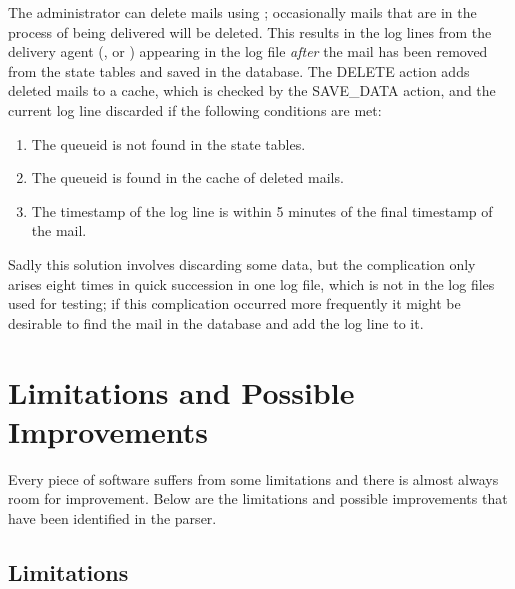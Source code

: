 \label{Mails deleted during delivery}

The administrator can delete mails using ; occasionally
mails that are in the process of being delivered will be deleted.  This
results in the log lines from the delivery agent (,
 or ) appearing in the log file
\textit{after\/} the mail has been removed from the state tables and saved
in the database.  The DELETE action adds deleted mails to a cache, which is
checked by the SAVE\_DATA action, and the current log line discarded if the
following conditions are met:

\begin{enumerate}

    \item The queueid is not found in the state tables.

    \item The queueid is found in the cache of deleted mails.

    \item The timestamp of the log line is within 5 minutes of the final
        timestamp of the mail.

\end{enumerate}

Sadly this solution involves discarding some data, but the complication
only arises eight times in quick succession in one log file, which is not
in the \numberOFlogFILES{} log files used for testing; if this complication
occurred more frequently it might be desirable to find the mail in the
database and add the log line to it.

\section{Limitations and Possible Improvements}

\label{limitations and improvements in implementation}

Every piece of software suffers from some limitations and there is almost
always room for improvement.  Below are the limitations and possible
improvements that have been identified in the parser.

\subsection{Limitations}

\label{logging helo}

